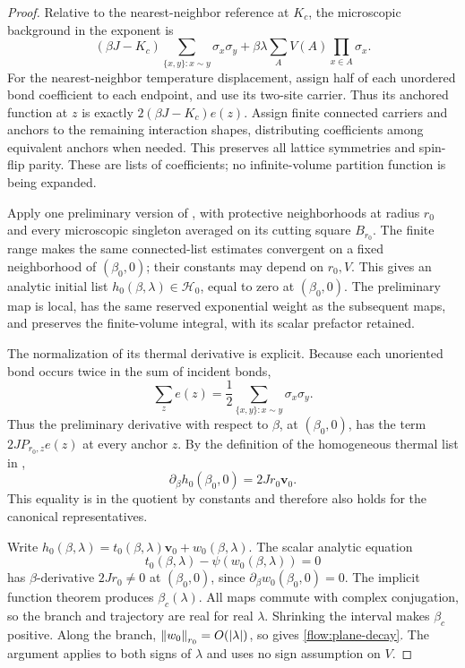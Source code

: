 \begin{proof}
Relative to the nearest-neighbor reference at $K_c$, the microscopic
background in the exponent is
\begin{equation}\label{flow:microscopic-background}
 (\beta J-K_c)\sum_{\{x,y\}:x\sim y}\sigma_x\sigma_y
       +\beta\lambda\sum_A V(A)\prod_{x\in A}\sigma_x.
\end{equation}
For the nearest-neighbor temperature displacement, assign half of each
unordered bond coefficient to each endpoint, and use its two-site carrier.
Thus its anchored function at $z$ is exactly
$2(\beta J-K_c)e(z)$. Assign finite connected carriers and anchors to the
remaining interaction shapes, distributing coefficients among equivalent
anchors when needed.  This preserves all lattice symmetries and spin-flip
parity.  These are lists of coefficients; no infinite-volume partition
function is being expanded.

Apply one preliminary version of , with protective
neighborhoods at radius $r_0$ and every microscopic singleton averaged
on its cutting square $B_{r_0}$.  The finite range makes the same
connected-list estimates convergent on a fixed neighborhood of
$(\beta_0,0)$; their constants may depend on $r_0,V$.  This gives an
analytic initial list $h_0(\beta,\lambda)\in\mathcal H_0$, equal to
zero at $(\beta_0,0)$.  The preliminary map is local, has the same
reserved exponential weight as the subsequent maps, and preserves
the finite-volume integral, with its scalar prefactor retained.

The normalization of its thermal derivative is explicit.  Because
each unoriented bond occurs twice in the sum of incident bonds,
\[
             \sum_z e(z)=\frac12\sum_{\{x,y\}:x\sim y}
                                           \sigma_x\sigma_y.
\]
Thus the preliminary derivative with respect to $\beta$, at
$(\beta_0,0)$, has the term $2J P_{r_0,z}e(z)$ at every anchor $z$.
By the definition of the homogeneous thermal list in
,
\begin{equation}\label{flow:thermal-derivative}
       \partial_\beta h_0(\beta_0,0)
                        =2Jr_0\boldsymbol v_0.
\end{equation}
This equality is in the quotient by constants and therefore also
holds for the canonical representatives.

Write $h_0(\beta,\lambda)=t_0(\beta,\lambda)\boldsymbol v_0
+w_0(\beta,\lambda)$.  The scalar analytic equation
\[
       t_0(\beta,\lambda)-\psi(w_0(\beta,\lambda))=0
\]
has $\beta$-derivative $2Jr_0\ne0$ at $(\beta_0,0)$, since
$\partial_\beta w_0(\beta_0,0)=0$.  The implicit function theorem
produces $\beta_c(\lambda)$.  All maps commute with complex
conjugation, so the branch and trajectory are real for real $\lambda$.
Shrinking the interval makes $\beta_c$ positive.  Along the branch,
$\left\|w_0\right\|_{r_0}=O(|\lambda|)$, so  gives
\eqref{flow:plane-decay}.  The argument applies to both signs of
$\lambda$ and uses no sign assumption on $V$.
\end{proof}

